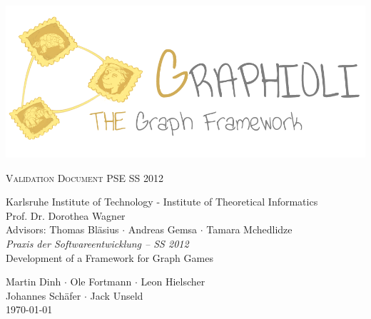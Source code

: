 \begin{titlepage}
\begin{center}

\begin{minipage}{1\linewidth}
	\vspace{2cm}
	\includegraphics[width=\textwidth]{../../materials/images/logo.png}
	\vspace{2cm}
\end{minipage}
	
\fontsize{40}{50}\selectfont
        \textsc{Validation Document}
        \vfill
\Large
PSE SS 2012
  \vfill
 \newpage
 
 \null
 \vfill
 \fontsize{12}{16}\selectfont
 Karlsruhe Institute of Technology - Institute of Theoretical Informatics \\
 Prof. Dr. Dorothea Wagner \\
 \vspace{.5cm}
 Advisors: Thomas Bläsius $\cdot$ Andreas Gemsa $\cdot$ Tamara Mchedlidze \\
 
 \vspace{2cm}
 \Large
 \emph{Praxis der Softwareentwicklung -- SS 2012} \\
 Development of a Framework for Graph Games \\
  \medskip
  \vspace{2cm}
  
    Martin Dinh $\cdot$ Ole Fortmann $\cdot$ Leon Hielscher \\ Johannes Schäfer $\cdot$ Jack Unseld
  \vspace{2cm} \\
  \today
\end{center}

  \vfill

\end{titlepage}
